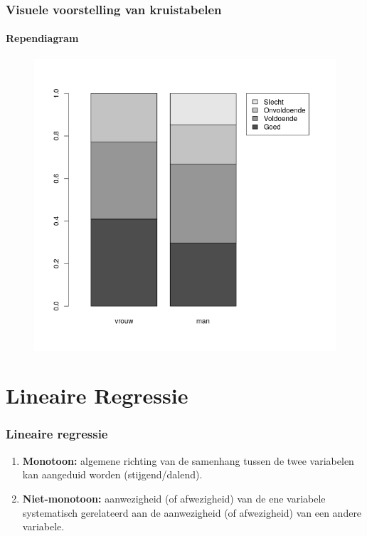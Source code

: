 \documentclass[aspectratio=169]{beamer}
\begin{document}
\begin{frame}
  \frametitle{Visuele voorstelling van kruistabelen}
  \framesubtitle{Rependiagram}
  
  \begin{figure}
    \centering
    \includegraphics[height=.9\textheight]{img/2var-rependiagram-waardering-mv}
  \end{figure}

\end{frame}

\section{Lineaire Regressie}

\begin{frame}
  \frametitle{Lineaire regressie}


  \begin{enumerate}
    \item \textbf{Monotoon:} algemene richting van de samenhang tussen de twee variabelen kan aangeduid worden (stijgend/dalend).
    \item \textbf{Niet-monotoon:}  aanwezigheid (of afwezigheid) van de ene variabele systematisch gerelateerd aan de aanwezigheid (of afwezigheid) van een andere variabele.
  \end{enumerate}
\end{frame}
\end{document}
